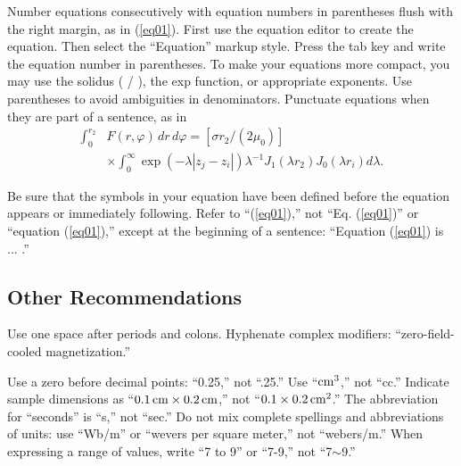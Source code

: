 \documentclass{fullpaper_hutech_v1.02}
\begin{document}
Number equations consecutively with equation numbers in parentheses flush with the right margin, as in (\ref{eq01}). First use the equation editor to create the equation. Then select the ``Equation'' markup style. Press the tab key and write the equation number in parentheses. To make your equations more compact, you may use the solidus ( / ), the exp function, or appropriate exponents. Use parentheses to avoid ambiguities in denominators. Punctuate equations when they are part of a sentence, as in
\begin{equation}\label{eq01}
\begin{split}\int_0^{r_2} &F(r,\varphi)\,dr\,d\varphi=[\sigma r_2 /(2\mu_0 )] \\
&\times\int_0^{\infty} \exp(-\lambda |z_j -z_i |)\lambda^{-1} J_1 (\lambda r_2 )J_0 (\lambda r_i )d\lambda.\end{split}
\end{equation}

Be sure that the symbols in your equation have been defined before the equation appears or immediately following. Refer to ``(\ref{eq01}),'' not ``Eq. (\ref{eq01})'' or ``equation (\ref{eq01}),'' except at the beginning of a sentence: ``Equation (\ref{eq01}) is ... .''


\subsection{Other Recommendations}

Use one space after periods and colons. Hyphenate complex modifiers: ``zero-field-cooled magnetization.''

Use a zero before decimal points: ``0.25,'' not ``.25.'' Use ``$\rm cm^3$,'' not ``cc.'' Indicate sample dimensions as ``$0.1\,\rm cm\times 0.2\, cm$,'' not ``$0.1\times 0.2\,\rm cm^2$.'' The abbreviation for ``seconds'' is ``s,'' not ``sec.'' Do not mix complete spellings and abbreviations of units: use ``Wb/m'' or ``wevers per square meter,'' not ``webers/m.'' When expressing a range of values, write ``7 to 9'' or ``7-9,'' not ``7$\sim$9.''
\end{document}
